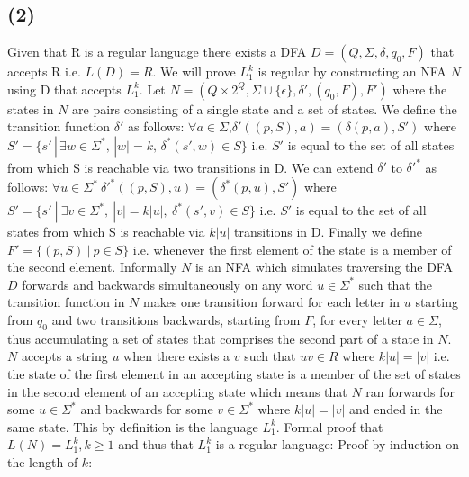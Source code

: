 \documentclass[12pt]{article}
\begin{document}
\subsection*{(2)}
Given that R is a regular language there exists a DFA
  $D = (Q, \Sigma, \delta, q_0, F)$ that accepts R i.e. $L(D) = R$.
  We will prove $L_1^k$ is regular by constructing
  an NFA $N$ using D that accepts $L_1^k$. Let $N = (Q \times 2^Q,
  \Sigma \cup \{\epsilon\}, \delta{'}, (q_0 , F), F')$ where the states in $N$
  are pairs consisting of a single state and a set of states. We define the
  transition function $\delta{'}$ as follows:
  \newline
  \indent $\forall a \in \Sigma$,\:$\delta{'}((p,S), a) = (\delta(p,a), S')$ where
  $S'= \{s'\,|\,\exists w \in \Sigma^*,\,|w| = k,\, \delta^*(s',w) \in S\}$
  \newline
  \indent i.e. $S'$ is equal to the set of all states from which S is reachable
  via two transitions in D.
  \newline
  We can extend $\delta{'}$ to $\delta{'}^*$ as follows:
  \newline
  \indent $\forall u \in \Sigma^*\: \delta{'}^* ((p,S),u) = (\delta^* (p, u),S')$
  where $S' = \{s'\:|\:\exists v \in \Sigma^* ,\: |v|=k|u| ,\:
  \delta^* (s', v) \in S\}$
  \newline
  \indent i.e. $S'$ is equal to the set of all states from which S is reachable
  via $k|u|$ transitions in D.
  \newline
  Finally we define $F'=\{(p,S)\:|\: p \in S\}$ i.e. whenever the first element
  of the state is a member of the second element. Informally $N$ is an NFA which
  simulates traversing the DFA $D$ forwards and backwards simultaneously on any
  word $u \in \Sigma^*$ such that the transition function in $N$ makes one
  transition forward for each letter in $u$ starting from $q_0$ and two
  transitions backwards, starting from $F$, for every letter $a\in\Sigma$, thus
  accumulating a set of states that comprises the second part of a state in $N$.
  $N$ accepts a string $u$ when there exists a $v$ such that $uv \in R$ where
  $k|u| = |v|$ i.e. the state of the first element in an accepting state
  is a member of the set of states in the second element of an accepting state
  which means that $N$ ran forwards for some $u \in \Sigma^*$ and backwards for
  some $v \in \Sigma^*$ where $k|u| = |v|$ and ended in the same state.
  This by definition is the language $L_1^k$. Formal proof that $L(N) = L_1^k, k \ge 1$ and
  thus that $L_1^k$ is a regular language:\newline
  Proof by induction on the length of $k$:
\end{document}
